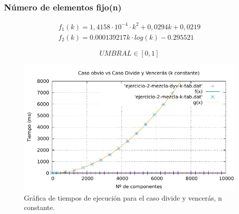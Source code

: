\subsubsection{Número de elementos fijo(n)}

\begin{eqnarray}
    f_1(k) = 1,4158 \cdot 10^{-4} \cdot k^2 + 0,0294 k + 0,0219\\
    f_2(k) = 0.000139217 k \cdot log(k) - 0.295521
\end{eqnarray} 

\begin{equation}
   \boxed{UMBRAL \in [0,1]}
\end{equation}

\begin{figure}[h]
    \centering
    \includegraphics[scale=0.76]{img/2-umbral-k.pdf}
    \caption{Gráfica de tiempos de ejecución para el caso divide y vencerás, n constante.}
\end{figure}